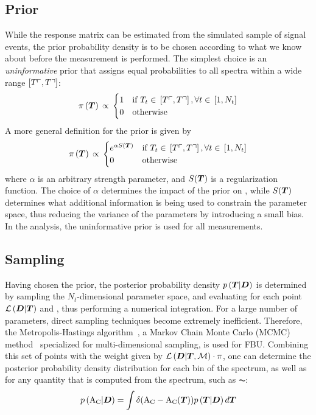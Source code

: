 \documentclass[a4paper]{article}
\begin{document}
\subsection{Prior}
\label{sec:fbuprior}
While the response matrix can be estimated from the simulated
sample of signal events, the prior probability density \prior{} is to
be chosen according to what we know about \Truth{} before the
measurement is performed.
The simplest choice is an {\it uninformative}
prior that assigns equal probabilities to all \Truth{} spectra within
a wide range $\left[T\ulcorner{}{}, T\urcorner{}{}\right]$:
\begin{equation}
\pi{}\left(\boldsymbol{T}{}\right){}
\propto{}
\begin{cases}
1 & \text{if }
T_{t}\in{}\left[T\ulcorner{}{}, T\urcorner{}{}\right], \forall{}t\in{}\left[1, N_t\right] \\
0 & \text{otherwise} \\
\end{cases}
\end{equation}
A more general definition for the prior is given by
\begin{equation}
\pi{}\left(\boldsymbol{T}{}\right){}
\propto{}
\begin{cases}
e^{\alpha{}S(\boldsymbol{T}{})} & \text{if }
T_{t}\in{}\left[T\ulcorner{}{}, T\urcorner{}{}\right], \forall{}t\in{}\left[1, N_t\right] \\
0 & \text{otherwise} \\
\end{cases}
\end{equation}
where $\alpha{}$ is an arbitrary strength parameter, and
$S(\boldsymbol{T}{})$ is a regularization function.
The choice of $\alpha$ determines the impact of the prior on
\conditionalProb{\Truth{}}{\Data{}}, while $S(\boldsymbol{T}{})$ determines
what additional information is being used to constrain the parameter
space, thus reducing the variance of the \Truth{} parameters by
introducing a small bias.
In the analysis, the uninformative
prior is used for all measurements.

\subsection{Sampling}
\label{subsec:sampling}
Having chosen the prior, the posterior probability density 
$p\left(\boldsymbol{T}{}|\boldsymbol{D}{}\right)$ is determined by 
sampling the $N_t$-dimensional parameter space, 
and evaluating for each point $\mathcal{L}\left(\boldsymbol{D}{}|\boldsymbol{T}{}\right)$ and
\prior{}, thus performing a numerical integration. 
For a large number of parameters, direct sampling techniques 
become extremely inefficient. Therefore, the Metropolis-Hastings algorithm~\cite{Metropolis:1953am}, 
a Markov Chain Monte Carlo (MCMC) method~\cite{Markov} 
specialized for multi-dimensional sampling, is used for FBU. Combining this set of points with the 
weight given by $\mathcal{L}\left(\boldsymbol{D}{}|\boldsymbol{T}{},\mathcal{M}{}\right) \cdot \pi$, 
one can determine the posterior probability density distribution 
for each bin of the spectrum, as well as for any quantity that is 
computed from the spectrum, such as $\AC{}$:
\begin{equation}
p\left(\text{A}_{\text{C}}{}|\boldsymbol{D}{}\right) = \int{ \delta(\ensuremath{\text{A}_{\text{C}}}{} - \ensuremath{\text{A}_{\text{C}}}{}(\ensuremath{\boldsymbol{T}}{})) \ensuremath{p\left(\boldsymbol{T}{}|\boldsymbol{D}{}\right)} d \ensuremath{\boldsymbol{T}}{}} 
\end{equation}
\end{document}

